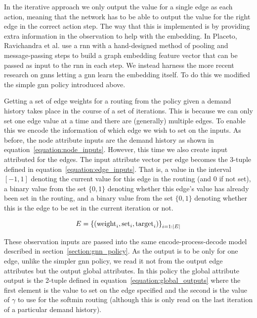 In the iterative approach we only output the value for a single edge as each action, meaning that the network has to be able to output the value for the right edge in the correct action step. The way that this is implemented is by providing extra information in the observation to help with the embedding. In Placeto, Ravichandra et al. use a \acf{rnn} with a hand-designed method of pooling and message-passing steps to build a graph embedding feature vector that can be passed as input to the \ac{rnn} in each step. We instead harness the more recent research on \acp{gnn} letting a \ac{gnn} learn the embedding itself. To do this we modified the simple \ac{gnn} policy introduced above.

Getting a set of edge weights for a routing from the policy given a demand history takes place in the course of a set of iterations. This is because we can only set one edge value at a time and there are (generally) multiple edges. To enable this we encode the information of which edge we wish to set on the inputs. As before, the node attribute inputs are the demand history as shown in equation~\ref{equation:node_inputs}. However, this time we also create input attributed for the edges. The input attribute vector per edge becomes the 3-tuple defined in equation~\ref{equation:edge_inputs}. That is, a value in the interval $[-1,1]$ denoting the current value for this edge in the routing (and 0 if not set), a binary value from the set $\{0,1\}$ denoting whether this edge's value has already been set in the routing, and a binary value from the set $\{0,1\}$ denoting whether this is the edge to be set in the current iteration or not.

\begin{equation}
  \label{equation:edge_inputs}
  E = \left\{ (\operatorname{weight}_i, \operatorname{set\vphantom{_i}}_i, \operatorname{target}_i) \right\}_{i=1:|E|}
\end{equation}

These observation inputs are passed into the same encode-process-decode model described in section~\ref{section:gnn_policy}. As the output is to be only for one edge, unlike the simpler \ac{gnn} policy, we read it not from the output edge attributes but the output global attributes. In this policy the global attribute output is the 2-tuple defined in equation~\ref{equation:global_outputs} where the first element is the value to set on the edge specified and the second is the value of $\gamma$ to use for the softmin routing (although this is only read on the last iteration of a particular demand history).

